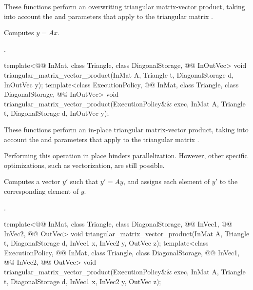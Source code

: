 \begin{itemdescr}

\pnum
These functions perform
an overwriting triangular matrix-vector product,
taking into account the  and  parameters
that apply to the triangular matrix .

\pnum
\effects
Computes $y = A x$.

\pnum
\complexity
{}.
\end{itemdescr}

%
\begin{itemdecl}
template<@@ InMat, class Triangle, class DiagonalStorage, @@ InOutVec>
  void triangular_matrix_vector_product(InMat A, Triangle t, DiagonalStorage d, InOutVec y);
template<class ExecutionPolicy,
         @@ InMat, class Triangle, class DiagonalStorage, @@ InOutVec>
  void triangular_matrix_vector_product(ExecutionPolicy&& exec,
                                        InMat A, Triangle t, DiagonalStorage d, InOutVec y);
\end{itemdecl}

\begin{itemdescr}

\pnum
These functions perform an in-place triangular matrix-vector product,
taking into account the  and  parameters
that apply to the triangular matrix .
\begin{note}
Performing this operation in place hinders parallelization.
However, other  specific optimizations,
such as vectorization, are still possible.
\end{note}

\pnum
\effects
Computes a vector $y'$ such that $y' = A y$,
and assigns each element of $y'$ to the corresponding element of $y$.

\pnum
\complexity
{}.
\end{itemdescr}

%
\begin{itemdecl}
template<@@ InMat, class Triangle, class DiagonalStorage,
         @@ InVec1, @@ InVec2, @@ OutVec>
  void triangular_matrix_vector_product(InMat A, Triangle t, DiagonalStorage d,
                                        InVec1 x, InVec2 y, OutVec z);
template<class ExecutionPolicy, @@ InMat, class Triangle, class DiagonalStorage,
         @@ InVec1, @@ InVec2, @@ OutVec>
  void triangular_matrix_vector_product(ExecutionPolicy&& exec,
                                        InMat A, Triangle t, DiagonalStorage d,
                                        InVec1 x, InVec2 y, OutVec z);
\end{itemdecl}

